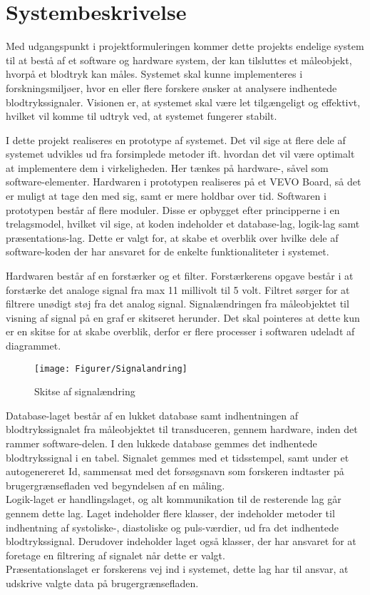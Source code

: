 \chapter{Systembeskrivelse}
Med udgangspunkt i projektformuleringen kommer dette projekts endelige system til at bestå af et software og hardware system, der kan tilsluttes et måleobjekt, hvorpå et blodtryk kan måles. Systemet skal kunne implementeres i forskningsmiljøer, hvor en eller flere forskere ønsker at analysere indhentede blodtrykssignaler. Visionen er, at systemet skal være let tilgængeligt og effektivt, hvilket vil komme til udtryk ved, at systemet fungerer stabilt.

I dette projekt realiseres en prototype af systemet. Det vil sige at flere dele af systemet udvikles ud fra forsimplede metoder ift. hvordan det vil være optimalt at implementere dem i virkeligheden. Her tænkes på hardware-, såvel som software-elementer. Hardwaren i prototypen realiseres på et VEVO Board, så det er muligt at tage den med sig, samt er mere holdbar over tid. Softwaren i prototypen består af flere moduler. Disse er opbygget efter principperne i en trelagsmodel, hvilket vil sige, at koden indeholder et database-lag, logik-lag samt præsentations-lag. Dette er valgt for, at skabe et overblik over hvilke dele af software-koden der har ansvaret for de enkelte funktionaliteter i systemet.

Hardwaren består af en forstærker og et filter. Forstærkerens opgave består i at forstærke det analoge signal fra max 11 millivolt til 5 volt. Filtret sørger for at filtrere unødigt støj fra det analog signal. Signalændringen fra måleobjektet til visning af signal på en graf er skitseret herunder. Det skal pointeres at dette kun er en skitse for at skabe overblik, derfor er flere processer i softwaren udeladt af diagrammet. 
\begin{figure}[htb]
	\centering
	\texttt{[image: Figurer/Signalandring]}
	\caption{Skitse af signalændring}
\end{figure}
Database-laget består af en lukket database samt indhentningen af blodtrykssignalet fra måleobjektet til transduceren, gennem hardware, inden det rammer software-delen. I den lukkede database gemmes det indhentede blodtrykssignal i en tabel. Signalet gemmes med et tidsstempel, samt under et autogenereret Id, sammensat med det forsøgsnavn som forskeren indtaster på brugergrænsefladen ved begyndelsen af en måling. \\
Logik-laget er handlingslaget, og alt kommunikation til de resterende lag går gennem dette lag. Laget indeholder flere klasser, der indeholder metoder til indhentning af systoliske-, diastoliske og puls-værdier, ud fra det indhentede blodtrykssignal. Derudover indeholder laget også klasser, der har ansvaret for at foretage en filtrering af signalet når dette er valgt. \\ 
Præsentationslaget er forskerens vej ind i systemet, dette lag har til ansvar, at udskrive valgte data på brugergrænsefladen. 

